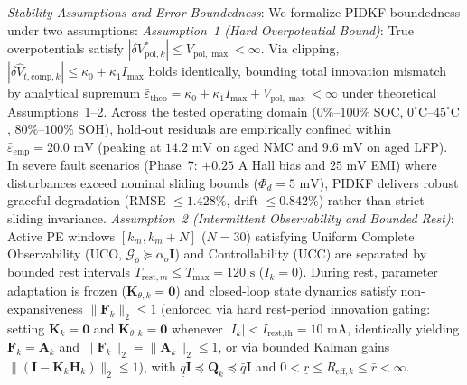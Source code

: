 \documentclass[balance,nocopyright,upint,varvw,hyphenate,barcolor=NavyBlue,nolists]{asmejour}
\begin{document}
\emph{Stability Assumptions and Error Boundedness}: We formalize PIDKF boundedness under two assumptions:
\emph{Assumption~1 (Hard Overpotential Bound)}: True overpotentials satisfy $|\delta V_{\text{pol},k}^*| \le V_{\text{pol},\max} < \infty$. Via clipping, $|\delta \hat{V}_{t,\text{comp},k}| \le \kappa_0 + \kappa_1 I_{\max}$ holds identically, bounding total innovation mismatch by analytical supremum $\bar{\varepsilon}_{\text{theo}} = \kappa_0 + \kappa_1 I_{\max} + V_{\text{pol},\max} < \infty$ under theoretical Assumptions~1--2. Across the tested operating domain ($0\%\text{--}100\%$ SOC, $0^\circ\text{C}\text{--}45^\circ\text{C}$, $80\%\text{--}100\%$ SOH), hold-out residuals are empirically confined within $\bar{\varepsilon}_{\text{emp}} = 20.0\text{ mV}$ (peaking at $14.2\text{ mV}$ on aged NMC and $9.6\text{ mV}$ on aged LFP). In severe fault scenarios (Phase~7: $+0.25\text{ A}$ Hall bias and $25\text{ mV}$ EMI) where disturbances exceed nominal sliding bounds ($\Phi_d = 5\text{ mV}$), PIDKF delivers robust graceful degradation (RMSE $\le 1.428\%$, drift $\le 0.842\%$) rather than strict sliding invariance.
\emph{Assumption~2 (Intermittent Observability and Bounded Rest)}: Active PE windows $[k_m, k_m+N]$ ($N=30$) satisfying Uniform Complete Observability (UCO, $\mathcal{G}_o \succeq \alpha_o \mathbf{I}$) and Controllability (UCC) are separated by bounded rest intervals $T_{\text{rest},m} \le T_{\max} = 120\text{ s}$ ($I_k = 0$). During rest, parameter adaptation is frozen ($\mathbf{K}_{\theta,k} = \mathbf{0}$) and closed-loop state dynamics satisfy non-expansiveness $\|\mathbf{F}_k\|_2 \le 1$ (enforced via hard rest-period innovation gating: setting $\mathbf{K}_k = \mathbf{0}$ and $\mathbf{K}_{\theta,k} = \mathbf{0}$ whenever $|I_k| < I_{\text{rest,th}} = 10\text{ mA}$, identically yielding $\mathbf{F}_k = \mathbf{A}_k$ and $\|\mathbf{F}_k\|_2 = \|\mathbf{A}_k\|_2 \le 1$, or via bounded Kalman gains $\|(\mathbf{I} - \mathbf{K}_k\mathbf{H}_k)\|_2 \le 1$), with $\underline{q}\mathbf{I} \preceq \mathbf{Q}_k \preceq \bar{q}\mathbf{I}$ and $0 < \underline{r} \le R_{\text{eff},k} \le \bar{r} < \infty$.
\end{document}
